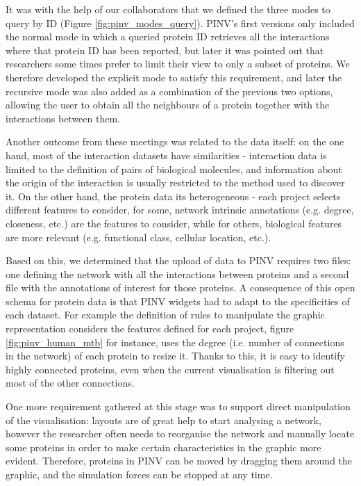 It was with the help of our collaborators that we defined the three modes to query by ID (Figure \ref{fig:pinv_modes_query}). PINV's first versions only included the normal mode in which a queried protein ID retrieves all the interactions where that protein ID has been reported, but later it was pointed out that researchers some times prefer to limit their view to only a subset of proteins. We therefore developed the explicit mode to satisfy this requirement, and later the recursive mode was also added as a combination of the previous two options, allowing the user to obtain all the neighbours of a protein together with the interactions between them.

Another outcome from these meetings was related to the data itself: on the one hand, most of the interaction datasets have similarities -  interaction data is  limited to the definition of pairs of biological molecules, and information about the origin of the interaction is usually restricted to the method used to discover it. On the other hand, the protein data its heterogeneous - each project selects different features to consider, for some, network intrinsic annotations (e.g. degree, closeness, etc.) are the features to consider, while for others, biological features are more relevant (e.g. functional class, cellular location, etc.). 

Based on this, we determined that the upload of data to PINV requires two files: one defining the network with all the interactions between proteins and a second file with the annotations of interest for those proteins. A consequence of this open schema for protein data is that PINV widgets had to adapt to the specificities of each dataset. For example the definition of rules to manipulate the graphic representation considers the features defined for each project, figure \ref{fig:pinv_human_mtb} for instance, uses the degree (i.e. number of connections in the network) of each protein to resize it. Thanks to this, it is easy to identify highly connected proteins, even when the current visualisation is filtering out most of the other connections.

One more requirement gathered at this stage was to support direct manipulation of the visualisation: layouts are of great help to start analysing a network, however the researcher often needs to reorganise the network and manually locate some proteins in order to make  certain characteristics in the graphic more evident. Therefore, proteins in PINV can be moved by dragging them around the graphic, and the simulation forces can be stopped at any time.



